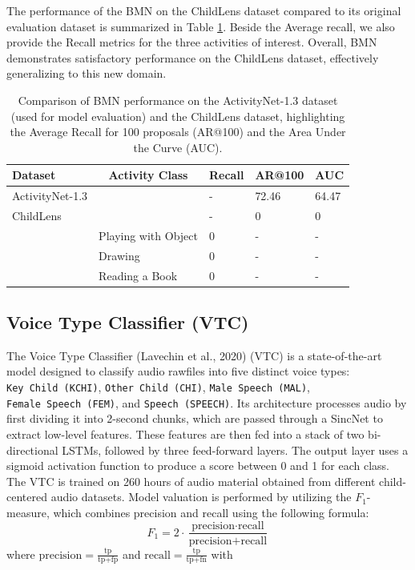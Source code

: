 \documentclass[
  man,floatsintext]{apa6}
\begin{document}
The performance of the BMN on the ChildLens dataset compared to its original evaluation dataset is summarized in Table \ref{tab:bmn-results}. Beside the Average recall, we also provide the Recall metrics for the three activities of interest. Overall, BMN demonstrates satisfactory performance on the ChildLens dataset, effectively generalizing to this new domain.

\begin{table}[tbp]

\begin{center}
\begin{threeparttable}

\caption{\label{tab:bmn-results}Comparison of BMN performance on the ActivityNet-1.3 dataset (used for model evaluation) and the ChildLens dataset, highlighting the Average Recall for 100 proposals (AR@100) and the Area Under the Curve (AUC).}

\begin{tabular}{lllll}
\toprule
Dataset & \multicolumn{1}{c}{Activity Class} & \multicolumn{1}{c}{Recall} & \multicolumn{1}{c}{AR@100} & \multicolumn{1}{c}{AUC}\\
\midrule
ActivityNet-1.3 &  & - & 72.46 & 64.47\\
ChildLens &  & - & 0 & 0\\
 & Playing with Object & 0 & - & -\\
 & Drawing & 0 & - & -\\
 & Reading a Book & 0 & - & -\\
\bottomrule
\end{tabular}

\end{threeparttable}
\end{center}

\end{table}

\subsection{Voice Type Classifier (VTC)}\label{voice-type-classifier-vtc}

The Voice Type Classifier (Lavechin et al., 2020) (VTC) is a state-of-the-art model designed to classify audio rawfiles into five distinct voice types: \texttt{Key\ Child\ (KCHI)}, \texttt{Other\ Child\ (CHI)}, \texttt{Male\ Speech\ (MAL)}, \texttt{Female\ Speech\ (FEM)}, and \texttt{Speech\ (SPEECH)}. Its architecture processes audio by first dividing it into 2-second chunks, which are passed through a SincNet to extract low-level features. These features are then fed into a stack of two bi-directional LSTMs, followed by three feed-forward layers. The output layer uses a sigmoid activation function to produce a score between 0 and 1 for each class. The VTC is trained on 260 hours of audio material obtained from different child-centered audio datasets. Model valuation is performed by utilizing the \(F_1\)-measure, which combines precision and recall using the following formula:
\[
F_1 = 2 \cdot \frac{\text{precision} \cdot \text{recall}}{\text{precision} + \text{recall}}
\]
where \(\text{precision} = \frac{\text{tp}}{\text{tp} + \text{fp}}\) and \(\text{recall} = \frac{\text{tp}}{\text{tp} + \text{fn}}\) with
\end{document}
